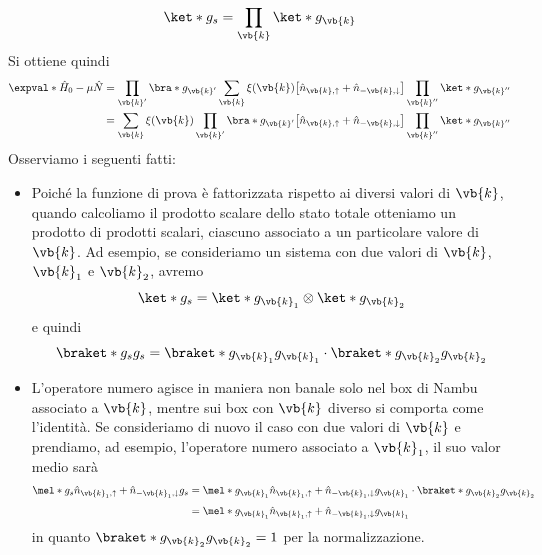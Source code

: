 \begin{equation*}
   \ket*{g_s}
   =\prod_{\vb{k}} \ket*{g_{\vb{k}}}
\end{equation*}
Si ottiene quindi
\begin{equation*}
   \begin{split}
      \expval*{\hat{H}_0 - \mu \hat{N}}
      & =\prod_{\vb{k}'} \bra*{g_{\vb{k}'}}
      \sum_{\vb{k}} \xi(\vb{k}) \bigl[ \hat{n}_{\vb{k},\uparrow} + \hat{n}_{-\vb{k},\downarrow} \bigr]
      \prod_{\vb{k}''} \ket*{g_{\vb{k}''}}
      \\
      & =\sum_{\vb{k}} \xi(\vb{k}) \prod_{\vb{k}'} \bra*{g_{\vb{k}'}}
      \bigl[ \hat{n}_{\vb{k},\uparrow} + \hat{n}_{-\vb{k},\downarrow} \bigr]
      \prod_{\vb{k}''} \ket*{g_{\vb{k}''}}
   \end{split}
\end{equation*}
Osserviamo i seguenti fatti:
\begin{itemize}[leftmargin=0.5cm]
   \item Poiché la funzione di prova è fattorizzata rispetto ai diversi valori di $\vb{k}$, quando calcoliamo il prodotto scalare dello stato totale otteniamo un prodotto di prodotti scalari, ciascuno associato a un particolare valore di $\vb{k}$. Ad esempio, se consideriamo un sistema con due valori di $\vb{k}$, $\vb{k}_1$ e $\vb{k}_2$, avremo
   \begin{equation*}
      \ket*{g_s} = \ket*{g_{\vb{k}_1}} \otimes \ket*{g_{\vb{k}_2}}
   \end{equation*}
   e quindi
   \begin{equation*}
      \braket*{g_s}{g_s}
      = \braket*{g_{\vb{k}_1}}{g_{\vb{k}_1}} \cdot \braket*{g_{\vb{k}_2}}{g_{\vb{k}_2}}
   \end{equation*}
   \item L'operatore numero agisce in maniera non banale solo nel box di Nambu associato a $\vb{k}$, mentre sui box con $\vb{k}$ diverso si comporta come l'identità. Se consideriamo di nuovo il caso con due valori di $\vb{k}$ e prendiamo, ad esempio, l'operatore numero associato a $\vb{k}_1$, il suo valor medio sarà
   \begin{equation*}
      \begin{split}
         \mel*{g_s}{\hat{n}_{\vb{k}_1,\uparrow} + \hat{n}_{-\vb{k}_1,\downarrow}}{g_s}
         & =
         \mel*{g_{\vb{k}_1}}{\hat{n}_{\vb{k}_1,\uparrow} + \hat{n}_{-\vb{k}_1,\downarrow}}{g_{\vb{k}_1}}
         \cdot \braket*{g_{\vb{k}_2}}{g_{\vb{k}_2}}
         \\[0.1cm]
         & =
         \mel*{g_{\vb{k}_1}}{\hat{n}_{\vb{k}_1,\uparrow} + \hat{n}_{-\vb{k}_1,\downarrow}}{g_{\vb{k}_1}}
      \end{split}
   \end{equation*}
   in quanto $\braket*{g_{\vb{k}_2}}{g_{\vb{k}_2}}=1$ per la normalizzazione.
\end{itemize}
